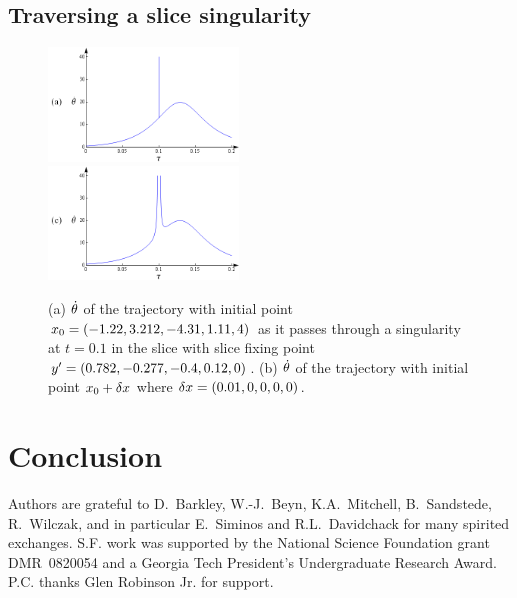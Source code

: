 \documentclass[%
 reprint,%
 amssymb, amsmath,%
 aip,cha,%
 graphicx
]{revtex4-1}
\begin{document}
\subsection{Traversing a slice singularity}
\label{sect:passingSing}

 \begin{figure}
\includegraphics[width=0.45\textwidth]{CLEsingpass}
\\
\includegraphics[width=0.45\textwidth]{CLEnearsing2}%
 \caption{\label{fig:dthetasing}
 (a) $\dot{{\bf \theta}}$ of the trajectory with initial point
$x_0=(-1.22, 3.212, -4.31, 1.11, 4)$ as it passes through a
singularity at $t=0.1$ in the slice with slice fixing point
${y'}=(0.782,-0.277,-0.4,0.12,0)$.
(b) $\dot{{\bf \theta}}$ of the trajectory with initial point $x_0+\delta
x$ where $\delta x=(0.01,0,0,0,0)$.
 }%
 \end{figure}

\section{Conclusion}
\label{sec:intro}


\begin{acknowledgments}
Authors are grateful to
D.~Barkley,
W.-J.~Beyn,
K.A.~Mitchell,
B.~Sandstede,
R.~Wilczak,
and in particular E.~Siminos and R.L.~Davidchack
for many spirited exchanges.
S.F. work was supported by the National Science Foundation
grant DMR~0820054 and a Georgia Tech President's Undergraduate
Research Award.
P.C. thanks Glen Robinson Jr. for support. 	
\end{acknowledgments}


\end{document}
